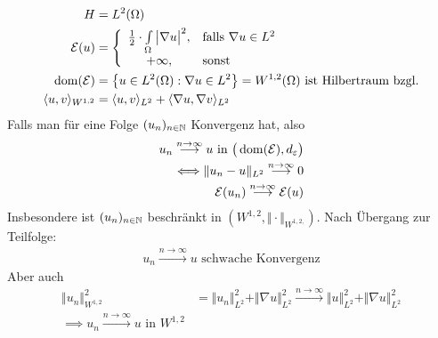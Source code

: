 \begin{beispiel}
	\begin{align*}
		H&=L^2(\Omega)\\
		\mathcal{E}(u)&=\left\lbrace\begin{array}{cl}
			\frac{1}{2}\cdot\int\limits_\Omega\big|\nabla u\big|^2, &\text{falls } \nabla u\in L^2\\
			+\infty, &\text{sonst }		
		\end{array}\right.\\
		\operatorname{dom}(\mathcal{E})&=\left\lbrace u\in L^2(\Omega):\nabla u\in L^2\right\rbrace=W^{1,2}(\Omega)\text{ ist Hilbertraum bzgl.}\\
		\langle u,v\rangle_{W^{1,2}}
		&=\langle u,v\rangle_{L^2}+\langle\nabla u,\nabla v\rangle_{L^2}
	\end{align*}
	Falls man für eine Folge $(u_n)_{n\in\mathbb{N}}$ Konvergenz hat, also
	\begin{align*}
		u_n\overset{n\to\infty}{\longrightarrow} u\text{ in }\big(\operatorname{dom}(\mathcal{E}),d_\varepsilon\big)\\
		\Longleftrightarrow\Vert u_n-u\Vert_{L^2}\overset{n\to\infty}{\longrightarrow}0\\
		\mathcal{E}(u_n)\overset{n\to\infty}{\longrightarrow}\mathcal{E}(u)
	\end{align*}
	Insbesondere ist $(u_n)_{n\in\mathbb{N}}$ beschränkt in $\left(W^{1,2},\Vert\cdot\Vert_{W^{1,2,}}\right)$.
	Nach Übergang zur Teilfolge:
	\begin{align*}
		u_n\overset{n\to\infty}{\longrightarrow}u\text{ schwache Konvergenz}
	\end{align*}
	Aber auch
	\begin{align*}
		\Vert u_n\Vert^2_{W^{1,2}}
		&=\Vert u_n\Vert_{L^2}^2+\Vert\nabla u\Vert_{L^2}^2
		\overset{n\to\infty}{\longrightarrow}
		\Vert u\Vert_{L^2}^2+\Vert\nabla u\Vert_{L^2}^2\\
		\implies u_n\overset{n\to\infty}{\longrightarrow} u\text{ in }W^{1,2}
	\end{align*}
\end{beispiel}

